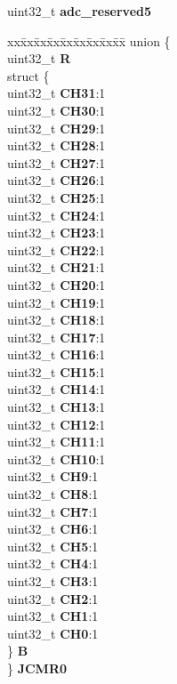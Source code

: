 \begin{DoxyCompactItemize}
\begin{tabbing}
\end{tabbing}\item 
\mbox{\label{structADC__tag_a7c1935a70da5a255afbfd49e7c2b7d1e}} 
uint32\+\_\+t {\bfseries adc\+\_\+reserved5}
\item 
\mbox{\label{structADC__tag_a47a1eeb99efcfac79c28ae6654665d25}} 
\begin{tabbing}
xx\=xx\=xx\=xx\=xx\=xx\=xx\=xx\=xx\=\kill
union \{\\
\>uint32\_t {\bfseries R}\\
\>struct \{\\
\>\>uint32\_t {\bfseries CH31}:1\\
\>\>uint32\_t {\bfseries CH30}:1\\
\>\>uint32\_t {\bfseries CH29}:1\\
\>\>uint32\_t {\bfseries CH28}:1\\
\>\>uint32\_t {\bfseries CH27}:1\\
\>\>uint32\_t {\bfseries CH26}:1\\
\>\>uint32\_t {\bfseries CH25}:1\\
\>\>uint32\_t {\bfseries CH24}:1\\
\>\>uint32\_t {\bfseries CH23}:1\\
\>\>uint32\_t {\bfseries CH22}:1\\
\>\>uint32\_t {\bfseries CH21}:1\\
\>\>uint32\_t {\bfseries CH20}:1\\
\>\>uint32\_t {\bfseries CH19}:1\\
\>\>uint32\_t {\bfseries CH18}:1\\
\>\>uint32\_t {\bfseries CH17}:1\\
\>\>uint32\_t {\bfseries CH16}:1\\
\>\>uint32\_t {\bfseries CH15}:1\\
\>\>uint32\_t {\bfseries CH14}:1\\
\>\>uint32\_t {\bfseries CH13}:1\\
\>\>uint32\_t {\bfseries CH12}:1\\
\>\>uint32\_t {\bfseries CH11}:1\\
\>\>uint32\_t {\bfseries CH10}:1\\
\>\>uint32\_t {\bfseries CH9}:1\\
\>\>uint32\_t {\bfseries CH8}:1\\
\>\>uint32\_t {\bfseries CH7}:1\\
\>\>uint32\_t {\bfseries CH6}:1\\
\>\>uint32\_t {\bfseries CH5}:1\\
\>\>uint32\_t {\bfseries CH4}:1\\
\>\>uint32\_t {\bfseries CH3}:1\\
\>\>uint32\_t {\bfseries CH2}:1\\
\>\>uint32\_t {\bfseries CH1}:1\\
\>\>uint32\_t {\bfseries CH0}:1\\
\>\} {\bfseries B}\\
\} {\bfseries JCMR0}\\


\end{tabbing}
\end{DoxyCompactItemize}
